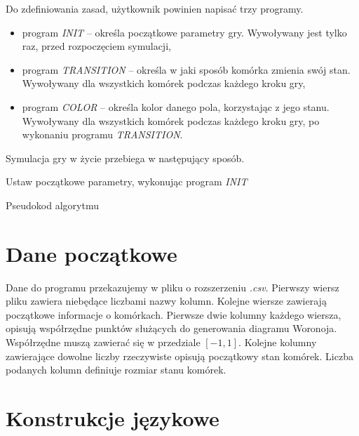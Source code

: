 \documentclass[declaration,shortabstract, inz]{iithesis}
\theoremstyle{definition} \newtheorem{definition}{Definicja}[]
\theoremstyle{plain} \newtheorem{remark}[definition]{Obserwacja}
\theoremstyle{plain} \newtheorem{theorem}[definition]{Twierdzenie}
\theoremstyle{plain} \newtheorem{example}{Przykład}[definition]
\theoremstyle{plain} \newtheorem{lemma}[definition]{Lemat}
\begin{document}
Do zdefiniowania zasad, użytkownik powinien napisać trzy programy. 
\begin{itemize}
\item program \textit{INIT} -- określa początkowe parametry gry. Wywoływany jest tylko raz, przed rozpoczęciem symulacji,
\item program \textit{TRANSITION} -- określa w jaki sposób komórka zmienia swój stan. Wywoływany dla wszystkich komórek podczas każdego kroku gry,
\item program \textit{COLOR} -- określa kolor danego pola, korzystając z jego stanu. Wywoływany dla wszystkich komórek podczas każdego kroku gry, po wykonaniu programu \textit{TRANSITION}.
\end{itemize}

Symulacja gry w życie przebiega w następujący sposób.

\begin{algorithm}[H]
\SetAlgoLined
	Ustaw początkowe parametry, wykonując program \textit{INIT}\\
 \caption{Pseudokod algorytmu}
\end{algorithm}

\section{Dane początkowe}
Dane do programu przekazujemy w pliku o rozszerzeniu \textit{.csv}. Pierwszy wiersz pliku zawiera niebędące liczbami nazwy kolumn. Kolejne wiersze zawierają początkowe informacje o komórkach. Pierwsze dwie kolumny każdego wiersza, opisują współrzędne punktów służących do generowania diagramu Woronoja.  Współrzędne muszą zawierać się w przedziale $[-1, 1]$. Kolejne kolumny zawierające dowolne liczby rzeczywiste opisują początkowy stan komórek. Liczba podanych kolumn definiuje rozmiar stanu komórek.

\section{Konstrukcje językowe}
\end{document}
